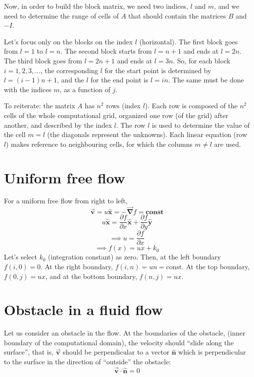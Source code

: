 \documentclass{article}
\let\toparrow\vec
\renewcommand{\vec}[1]{\toparrow{\mathbf{#1}}}
\newcommand{\uv}[1]{\hat{\mathbf{#1}}}
\begin{document}
Now, in order to build the block matrix, we need two indices, $l$ and $m$, and we
need to determine the range of cells of $A$ that should contain the matrices $B$ and
$-I$.

Let's focus only on the blocks on the index $l$ (horizontal). The first block goes from $l=1$
to $l=n$. The second block starts from $l=n+1$ and ends at $l=2n$. The third block
goes from $l=2n+1$ and ends at $l=3n$. So, for each block $i=1,2,3,...$, the
corresponding $l$ for the start point is determined by $l = (i-1)n+1 $, and
the $l$ for the end point is $l = in$. The same must be done with the indices
$m$, as a function of $j$.

To reiterate: the matrix $A$ has $n^2$ rows (index $l$). Each row is composed of the $n^2$
cells of the whole computational grid, organized one row (of the grid) after another,
and described by the index $l$. The row $l$ is used to determine the value of the
cell $m=l$ (the diagonals represent the unknowns). Each linear equation (row $l$)
makes reference to neighbouring cells, for which the columns $m\neq l$ are used.


\section{Uniform free flow}

For a uniform free flow from right to left,
\[ \vec v = u \uv x  = - \vec \nabla f = \mathbf{const} \]
\[ u \uv x = \frac{\partial f}{\partial x}\uv x + \frac{\partial f}{\partial y}\uv y \]
\[ \implies u = \frac{\partial f}{\partial x} \]
\[ \implies f(x)  = ux + k_0 \]
Let's select $k_0$ (integration constant) as zero. Then, at the left boundary
$f(i,0) = 0$. At the right boundary, $f(i,n) = un = \text{const}$.
At the top boundary, $f(0,j) = ux$, and at the bottom boundary, $f(n,j) = ux$.



\section{Obstacle in a fluid flow}

Let us consider an obstacle in the flow. At the boundaries of the obstacle,
(inner boundary of the computational domain), the velocity should
``slide along the surface'', that is, $\vec v$ should be perpendicular to a vector $\uv n$ which
is perpendicular to the surface in the direction of ``outside'' the obstacle:
\begin{equation} \vec v \cdot \uv n = 0 \label{innerboundary} \end{equation}
\end{document}
